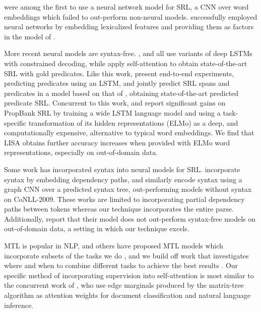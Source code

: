 \documentclass[11pt,a4paper]{article}
\begin{document}
\citet{collobert2011natural} were among the first to use a neural network model for SRL, a CNN over word embeddings which failed to out-perform non-neural models.
\citet{fitzgerald2015semantic} successfully employed neural networks by embedding lexicalized features and providing them as factors in the model of \citet{tackstrom2015efficient}.

More recent neural models are syntax-free. \citet{zhou2015end}, \citet{marcheggiani2017simple} and \citet{he2017deep} all use variants of deep LSTMs with constrained decoding, while \citet{tan2018deep} apply self-attention to obtain state-of-the-art SRL with gold predicates. Like this work, \citet{he2017deep} present end-to-end experiments, predicting predicates using an LSTM, and \citet{he2018jointly} jointly predict SRL spans and predicates in a model based on that of \citet{lee2017end}, obtaining state-of-the-art predicted predicate SRL. Concurrent to this work, \citet{peters2018deep} and \citet{he2018jointly} report significant gains on PropBank SRL by training a wide LSTM language model and using a task-specific transformation of its hidden representations (ELMo) as a deep, and computationally expensive, alternative to typical word embeddings. We find that LISA obtains further accuracy increases when provided with ELMo word representations, especially on out-of-domain data.


Some work has incorporated syntax into neural models for SRL. \citet{roth2016neural} incorporate syntax by embedding dependency paths, and similarly \citet{marcheggiani2017encoding} encode syntax using a graph CNN over a predicted syntax tree, out-performing models without syntax on CoNLL-2009. These works are limited to incorporating partial dependency paths between tokens whereas our technique incorporates the entire parse. Additionally, \citet{marcheggiani2017encoding} report that their model does not out-perform syntax-free models on out-of-domain data, a setting in which our technique excels.





MTL \citep{caruana1993multitask} is popular in NLP, and others have proposed MTL models which incorporate subsets of the tasks we do \citep{collobert2011natural, zhang2016stack, hashimoto2017joint, peng2017deep, swayamdipta2017}, and we build off work that investigates where and when to combine different tasks to achieve the best results \citep{sogaard2016deep, bingel2017identifying, alonso2017when}. Our specific method of incorporating supervision into self-attention is most similar to the concurrent work of \citet{liu2018learning}, who use edge marginals produced by the matrix-tree algorithm as attention weights for document classification and natural language inference.
\end{document}
